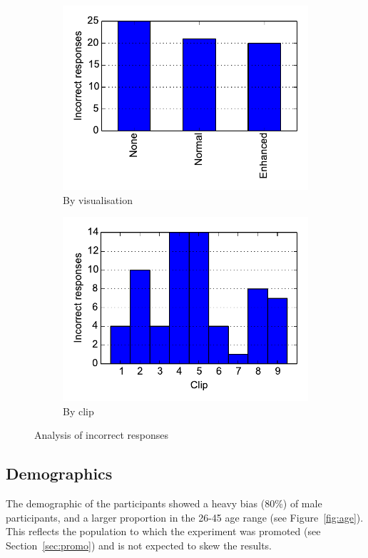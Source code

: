 \begin{figure}[ht]
\centering
\begin{subfigure}{.5\textwidth}
  \centering
  \includegraphics[width=\linewidth]{figs/rejects-vis.pdf}
  \caption{By visualisation}
  \label{fig:rejectvis}
\end{subfigure}%
\begin{subfigure}{.5\textwidth}
  \centering
  \includegraphics[width=\linewidth]{figs/rejects-clip.pdf}
  \caption{By clip}
  \label{fig:rejectclip}
\end{subfigure}
\caption{Analysis of incorrect responses}
\label{fig:rejects}
\end{figure}

\subsection{Demographics}
The demographic of the participants showed a heavy bias (80\%) of male participants, and a larger proportion in the
26-45 age range (see Figure~\ref{fig:age}). This reflects the population to which the experiment was promoted (see
Section~\ref{sec:promo}) and is not expected to skew the results.

